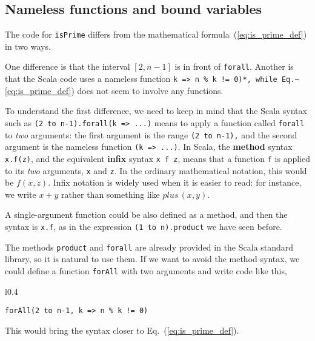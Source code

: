 \subsection{Nameless functions and bound variables}

The code for \texttt{}\lstinline!isPrime! differs from the mathematical
formula\ (\ref{eq:is_prime_def}) in two ways.

One difference is that the interval $\left[2,n-1\right]$ is in front
of \lstinline!forall!. Another is that the Scala code uses a nameless
function \lstinline*(k => n % k != 0)*, while Eq.~(\ref{eq:is_prime_def})
does not seem to involve any functions.

To understand the first difference, we need to keep in mind that the
Scala syntax such as \texttt{}\lstinline!(2 to n-1).forall(k => ...)!
means to apply a function called \texttt{}\lstinline!forall! to
\emph{two} arguments: the first argument is the range \texttt{}\lstinline!(2 to n-1)!\texttt{,}
and the second argument is the nameless function \lstinline!(k => ...)!.
In Scala, the \textbf{method} syntax \lstinline!x.f(z)!,
and the equivalent \textbf{infix} syntax \lstinline!x f z!,
means that a function \texttt{}\lstinline!f! is applied to its \emph{two}
arguments, \texttt{}\lstinline!x! and \lstinline!z!. In the ordinary
mathematical notation, this would be $f(x,z)$. Infix notation is
widely used when it is easier to read: for instance, we write $x+y$
rather than something like $plus\,(x,y)$.

A single-argument function could be also defined as a method, and
then the syntax is \lstinline!x.f!, as in the expression \texttt{}\lstinline!(1 to n).product!
we have seen before.

The methods \texttt{}\lstinline!product! and \texttt{}\lstinline!forall!
are already provided in the Scala standard library, so it is natural
to use them. If we want to avoid the method syntax, we could define
a function \texttt{}\lstinline!forAll! with two arguments and write
code like this,\hfill{}~ \begin{wrapfigure}{l}{0.4\columnwidth}%
\vspace{-0.8\baselineskip}
\begin{lstlisting}
forAll(2 to n-1, k => n % k != 0)
\end{lstlisting}

\vspace{-1.5\baselineskip}
\end{wrapfigure}%
This would bring the syntax closer to Eq.\ (\ref{eq:is_prime_def}). 

